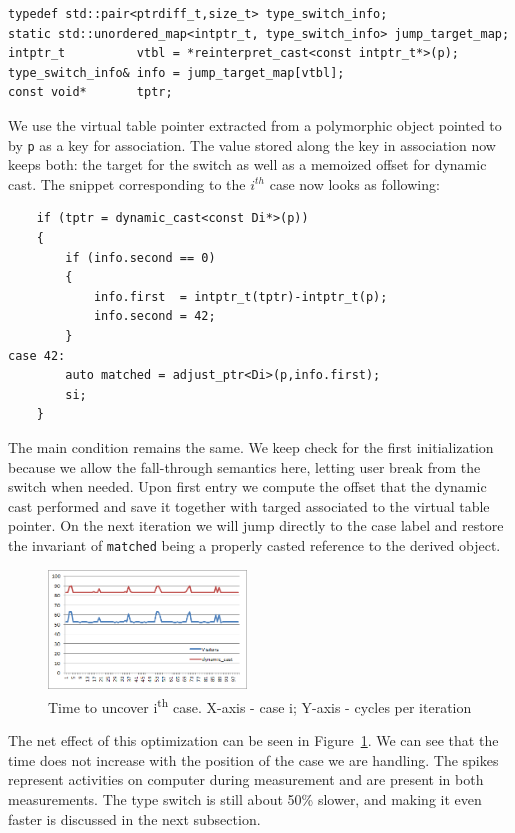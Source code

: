 \documentclass[preprint]{sigplanconf}
\makeatletter
\DeclareRobustCommand{\code}[1]{{\lstinline[breaklines=false,escapechar=@]{#1}}}
\makeatother
\begin{document}
\begin{lstlisting}
typedef std::pair<ptrdiff_t,size_t> type_switch_info;
static std::unordered_map<intptr_t, type_switch_info> jump_target_map;
intptr_t          vtbl = *reinterpret_cast<const intptr_t*>(p);
type_switch_info& info = jump_target_map[vtbl];
const void*       tptr; 
\end{lstlisting}

We use the virtual table pointer extracted from a polymorphic object pointed to 
by \code{p} as a key for association. The value stored along the key in 
association now keeps both: the target for the switch as well as a memoized 
offset for dynamic cast. The snippet corresponding to the $i^{th}$ case now 
looks as following:

\begin{lstlisting}
    if (tptr = dynamic_cast<const Di*>(p))
    {
        if (info.second == 0)
        {
            info.first  = intptr_t(tptr)-intptr_t(p);
            info.second = 42;
        }
case 42:
        auto matched = adjust_ptr<Di>(p,info.first); 
        si;
    }
\end{lstlisting}

\noindent
The main condition remains the same. We keep check for the first initialization 
because we allow the fall-through semantics here, letting user break from the 
switch when needed. Upon first entry we compute the offset that the dynamic cast 
performed and save it together with targed associated to the virtual table 
pointer. On the next iteration we will jump directly to the case label and 
restore the invariant of \code{matched} being a properly casted reference to the 
derived object.

\begin{figure}[htbp]
  \centering
    \includegraphics[width=0.47\textwidth]{DCast-vs-Visitors3.png}
  \caption{Time to uncover i\textsuperscript{th} case. X-axis - case i; Y-axis - cycles per iteration}
  \label{fig:DCastVis3}
\end{figure}

The net effect of this optimization can be seen in Figure~\ref{fig:DCastVis3}. 
We can see that the time does not increase with the position of the case we are 
handling. The spikes represent activities on computer during measurement and are 
present in both measurements. The type switch is still about 50\% slower, and 
making it even faster is discussed in the next subsection.
\end{document}

